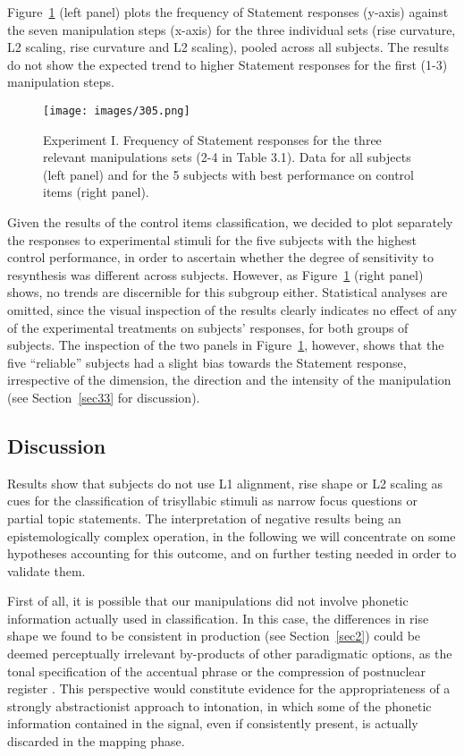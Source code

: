 Figure~\ref{fig305} (left panel) plots the frequency of Statement responses (y-axis) against the seven manipulation steps (x-axis) for the three individual sets (rise curvature, L2 scaling, rise curvature and L2 scaling), pooled across all subjects. The results do not show the expected trend to higher Statement responses for the first (1-3) manipulation steps. 

\begin{figure}[hbpt]
\centering
\texttt{[image: images/305.png]}
\caption{Experiment I. Frequency of Statement responses for the three relevant manipulations sets (2-4 in Table 3.1). Data for all subjects (left panel) and for the 5 subjects with best performance on control items (right panel).}
\label{fig305}\end{figure}

Given the results of the control items classification, we decided to plot separately the responses to experimental stimuli for the five subjects with the highest control performance, in order to ascertain whether the degree of sensitivity to resynthesis was different across subjects. However, as Figure~\ref{fig305} (right panel) shows, no trends are discernible for this subgroup either. Statistical analyses are omitted, since the visual inspection of the results clearly indicates no effect of any of the experimental treatments on subjects' responses, for both groups of subjects. The inspection of the two panels in Figure~\ref{fig305}, however, shows that the five ``reliable'' subjects had a slight bias towards the Statement response, irrespective of the dimension, the direction and the intensity of the manipulation (see Section~\ref{sec33} for discussion).

\subsection{Discussion}\label{sec323}
Results show that subjects do not use L1 alignment, rise shape or L2 scaling as cues for the classification of trisyllabic stimuli as narrow focus questions or partial topic statements. The interpretation of negative results being an epistemologically complex operation, in the following we will concentrate on some hypotheses accounting for this outcome, and on further testing needed in order to validate them.

First of all, it is possible that our manipulations did not involve phonetic information actually used in classification. In this case, the differences in rise shape we found to be consistent in production (see Section~\ref{sec2}) could be deemed perceptually irrelevant by-products of other paradigmatic options, as the tonal specification of the accentual phrase \citep{petrone2008tonal} or the compression of postnuclear register \citep{dimperio2011phrasing}. This perspective would constitute evidence for the appropriateness of a strongly abstractionist approach to intonation, in which some of the phonetic information contained in the signal, even if consistently present, is actually discarded in the mapping phase.

